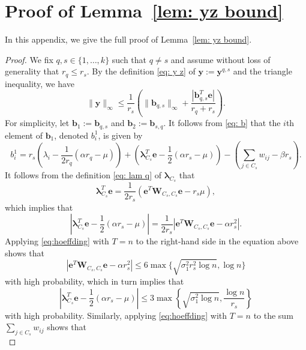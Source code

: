 \documentclass[twoside,11pt]{article}
\renewcommand{\b}{{\bs{b}}}
\newcommand{\e}{\bs {e}}
\newcommand{\bs}{\boldsymbol}
\newcommand{\W}{\bs {W}}
\newcommand{\0}{\bs{0}}
\newcommand{\bra}[1]{\ensuremath{\left\{ #1 \right\}}} %
\begin{document}
{\section{Proof of Lemma~\ref{lem: yz bound}}
\label{app: yz}
In this appendix, we give the full proof of Lemma~\ref{lem: yz bound}.

\begin{proof}
We fix $q,s \in \{1,\dots,k\}$ such that $q \neq s$ and assume without loss of generality that $r_q \leq r_s$. 
By the definition \eqref{eq: y z} of $\bs{y} := \bs{y}^{q,s}$ and the triangle inequality, we have
\begin{equation}
\label{eq:y_inf}
\|\bs{y}\|_{\infty} \leq \frac{1}{r_s}\left( \|\bs{b}_{q,s}\|_{\infty} + \frac{|\bs{b}_{q,s}^T \bs{e}|}{r_q +r_s}\right).
\end{equation}
For simplicity, let \(\b_1:= \b_{q,s}\) and \(\b_2 := \b_{s,q}\).
It follows from \eqref{eq: b} that the $i$th element of $\bs{b}_1$, denoted $b_i^1$, is given by
$$ b_i^1 = r_s \left( \lambda_i -\frac{1}{2r_q}(\alpha r_q - \mu) \right) + \left(\bs{\lambda}_{C_s}^T\bs{e}
- \frac{1}{2}(\alpha r_s - \mu) \right) - \left( \sum_{j \in C_s} w_{ij} - \beta r_s \right).$$
It follows from the definition \eqref{eq: lam q} of $\bs{\lambda}_{C_s}$  that
$$ \bs{\lambda}_{C_s}^T\bs{e} = \frac{1}{2 r_s}\left(\bs{e}^T\bs{W}_{C_s,C_s}\bs{e} - r_s \mu \right),$$
which implies that 
$$ \left| \bs{\lambda}_{C_s}^T\bs{e} - \frac{1}{2}(\alpha r_s - \mu)  \right| = \frac{1}{2r_s}\left|\bs{e}^T\bs{W}_{C_s,C_s}\bs{e}-\alpha r_s^2 \right|.$$
Applying \eqref{eq:hoeffding} with $T = n$ to the right-hand side in the equation above shows that
\begin{equation} \label{cluster sum}
	|\e^T \W_{C_s, C_s} \e - \alpha r_s^2 |
	 \le 6 \max \{ \sqrt{\sigma_1^2 r_s^2 \log n}, \log n \}
\end{equation}
with high probability,
which in turn implies that
\begin{equation} \label{lam sum}
	\left| \bs{\lambda}_{C_s}^T\bs{e} - \frac{1}{2}(\alpha r_s - \mu)  
	\right| \le 3 \max\bra{ \sqrt{\sigma_1^2  \log n}, \frac{\log n}{r_s} }
\end{equation}
with high probability.
Similarly, applying \eqref{eq:hoeffding} with $T=n$ to the sum $\sum_{j\in C_s} w_{ij}$ shows that
\begin{equation} \label{out sum}

\end{equation}
\end{proof}}
\end{document}
